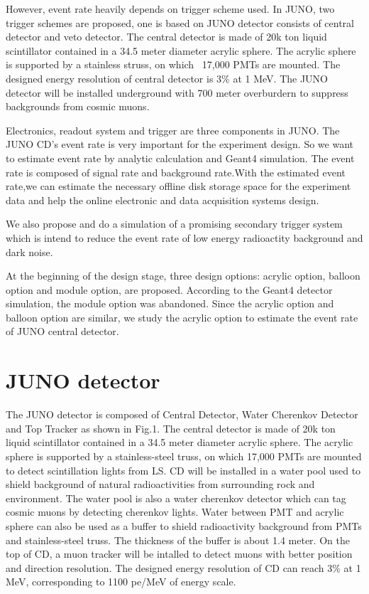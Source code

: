 \documentclass[a4paper,10pt,twoside]{paper}
\begin{document}
\begin{multicols}{2}
                However, event rate heavily depends on trigger scheme used. In JUNO, two trigger schemes are proposed, one is based on 
                JUNO detector consists of central detector and veto detector. 
                The central detector is made of 20k ton liquid scintillator contained in a 34.5 meter diameter acrylic sphere. 
                The acrylic sphere is supported by a stainless struss, on which ~17,000 PMTs are mounted. The designed energy resolution of central detector is 3\% at 1 MeV.
                The JUNO detector will be installed underground with 700 meter overburdern to suppress backgrounds from cosmic muons.
                
		Electronics, readout system and trigger are three components in JUNO.
		The JUNO CD's event rate is very important for 
		the experiment design. So we want to estimate 
		event rate by analytic calculation and Geant4 simulation. The
		event rate is composed of signal rate and background
		rate.With the estimated event rate,we can estimate the necessary
		offline disk storage space for the experiment data and help the 
		online electronic and data acquisition systems design.
		
		We also propose and do a simulation of a promising secondary trigger system which is intend to
		reduce the event rate of low energy 
		radioactity background and dark noise. 

		At the beginning of the design stage, 
		three design options: acrylic option, balloon option and 
		module option, are proposed. According to the Geant4 detector simulation,
		the module option was abandoned. Since the acrylic option
		and balloon option are similar, we study the acrylic option
		to estimate the event rate of JUNO central detector.




		\section{JUNO detector}
		The JUNO detector is composed of  Central Detector, Water
		Cherenkov Detector and Top Tracker as shown in Fig.1. The 
		central detector is made of 20k ton liquid scintillator contained in a 34.5 meter diameter acrylic sphere.
                The acrylic sphere is supported by a stainless-steel truss, on which 17,000 PMTs are mounted to detect scintillation lights from LS. 
		CD will be installed in a water pool used to shield background of natural radioactivities from surrounding rock and environment. 
                The water pool is also a water cherenkov detector which can tag cosmic muons by detecting cherenkov lights. 
                Water between PMT and acrylic sphere can also be used as a buffer to shield radioactivity background from PMTs and stainless-steel truss.
                The thickness of the buffer is about 1.4 meter. On the top of CD, a muon tracker will be intalled to detect muons with better position and direction resolution.
                The designed energy resolution of CD can reach 3\% at 1 MeV, corresponding to 1100 pe/MeV of energy scale.


\end{multicols}
\end{document}
